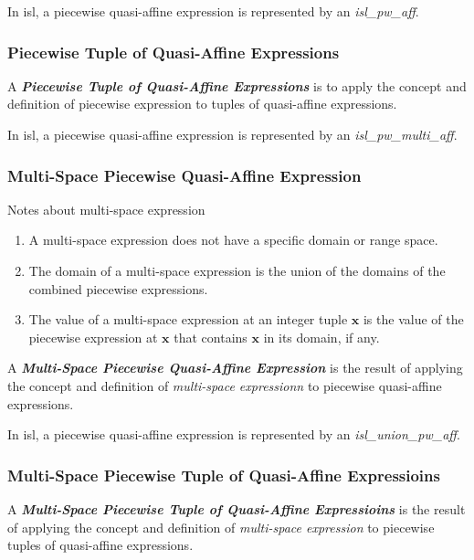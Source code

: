 In isl, a piecewise quasi-affine expression is represented by an \textcolor{pg}{\emph{isl\_pw\_aff}}.

\subsubsection{Piecewise Tuple of Quasi-Affine Expressions}
A \textcolor{vr}{\textbf{\emph{Piecewise Tuple of Quasi-Affine Expressions}}} is to apply the concept and definition of piecewise expression to tuples of quasi-affine expressions.

In isl, a piecewise quasi-affine expression is represented by an \textcolor{pg}{\emph{isl\_pw\_multi\_aff}}.

\subsubsection{Multi-Space Piecewise Quasi-Affine Expression}

\begin{info}{Notes about multi-space expression}
\begin{enumerate}
  \item A multi-space expression does not have a specific domain or range space.
  \item The domain of a multi-space expression is the union of the domains of the combined piecewise expressions.
  \item The value of a multi-space expression at an integer tuple $\mathbf{x}$ is the value of the piecewise expression at $\mathbf{x}$ that contains $\mathbf{x}$ in its domain, if any.
\end{enumerate}
\end{info}

A \textcolor{vr}{\textbf{\emph{Multi-Space Piecewise Quasi-Affine Expression}}} is the result of applying the concept and definition of \emph{multi-space expressionn} to piecewise quasi-affine expressions.

In isl, a piecewise quasi-affine expression is represented by an \textcolor{pg}{\emph{isl\_union\_pw\_aff}}.

\subsubsection{Multi-Space Piecewise Tuple of Quasi-Affine Expressioins}

A \textcolor{vr}{\textbf{\emph{Multi-Space Piecewise Tuple of Quasi-Affine Expressioins}}} is the result of applying the concept and definition of \emph{multi-space expression} to piecewise tuples of quasi-affine expressions.

